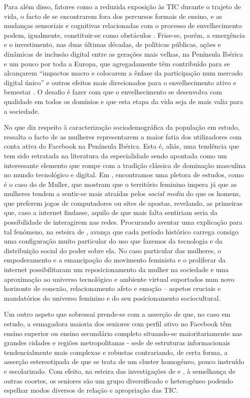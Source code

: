 \documentclass[portuguese]{textolivre}
\begin{document}
Para além disso, fatores como a reduzida exposição às TIC durante o trajeto de vida, o facto de se encontrarem fora dos percursos formais de ensino, e as mudanças sensoriais e cognitivas relacionadas com o processo de envelhecimento podem, igualmente, constituir-se como obstáculos \cite{van_deursen2014}. Frise-se, porém, a emergência e o investimento, nas duas últimas décadas, de políticas públicas, ações e dinâmicas de inclusão digital entre as gerações mais velhas, na Península Ibérica e um pouco por toda a Europa, que agregadamente têm contribuído para se alcançarem “impactos macro e colocarem a ênfase da participação num mercado digital único” \cite[p. 311]{coelho2019} e outros efeitos mais direcionados para o envelhecimento ativo e bemestar \cite{paul2005}. O desafio é fazer com que o envelhecimento se desenvolva com qualidade em todos os domínios e que esta etapa da vida seja de mais valia para a sociedade.  

No que diz respeito à caracterização sociodemográfica da população em estudo, ressalta o facto de as mulheres representarem a maior fatia dos utilizadores com conta ativa do Facebook na Península Ibérica. Esta é, aliás, uma tendência que tem sido retratada na literatura da especialidade sendo apontada como um interessante elemento que rompe com a tradição clássica de dominação masculina no mundo tecnológico e digital. Em \textcite{roxo2016}, encontramos uma pletora de estudos, como é o caso do de Muller, que mostram que o território feminino impera já que as mulheres tendem a sentir-se mais atraídas pelos \emph{social media} do que os homens, que preferem jogos de computadores ou sites de apostas, revelando, as primeiras que, caso a internet findasse, aquilo de que mais falta sentiriam seria da possibilidade de interagirem nas redes. Procurando aventar uma explicação para tal fenómeno, na esteira de \textcite{braga2011}, \textcite{roxo2016} avança que cada período histórico carrega consigo uma configuração muito particular do uso que fazemos da tecnologia e da distribuição social do poder sobre ela. No caso particular das mulheres, o empoderamento e a emancipação do movimento feminista e o proliferar da internet possibilitaram um reposicionamento da mulher na sociedade e uma aproximação ao universo tecnológico e ambiente virtual suportados num novo horizonte de conexão, relacionamento afeto e emoção – aspetos cruciais e mandatórios do universo feminino e do seu posicionamento sociocultural.

Um outro aspeto que sobressai prende-se com a asserção de que, no caso em estudo, a esmagadora maioria dos seniores com perfil ativo no Facebook têm ensino superior ou ensino secundário completo situando-se maioritariamente nas grandes cidades e regiões metropolitanas - sede de estruturas informacionais tendencialmente mais complexas e robustas contrariando, de certa forma, a asserção estereotipada de que se trata de um cluster homogéneo, pouco instruído e escolarizado. Com efeito, na esteira das investigações de \textcite{van_boekel2017} e \textcite{coelho2019}, à semelhança de outras coortes, os seniores são um grupo diversificado e heterogéneo podendo espelhar modos diversos de relação e apropriação das TIC.
\end{document}

